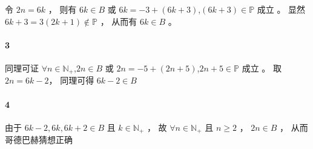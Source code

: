 \documentclass[11pt]{article}
\begin{document}
令 $2n=6k$ ， 则有 $6k\in{B}$ 或 $6k=-3+(6k+3)$,$(6k+3)\in\mathbb{P}$ 成立 。 显然 $6k+3=3(2k+1)\notin\mathbb{P}$ ， 从而有 $6k\in{B}$ 。

\paragraph{3}

同理可证 $\forall{n}\in\mathbb{N}_+$,$2n\in{B}$ 或 $2n=-5+(2n+5)$,$2n+5\in\mathbb{P}$ 成立 。 取 $2n=6k-2 $， 同理可得 $6k-2\in{B}$



\paragraph{4}
由于 $6k-2,6k,6k+2\in{B}$ 且 $k\in\mathbb{N}_+$ ， 故 $\forall{n}\in\mathbb{N}_+$ 且 $n\ge2$ ， $2n\in{B}$ ， 从而哥德巴赫猜想正确
\end{document}
